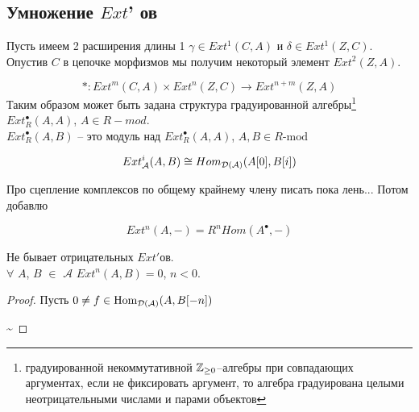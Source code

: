 \documentclass[../main.tex]{subfiles}
\begin{document}
\subsection{Умножение $Ext$' ов}
Пусть имеем 2 расширения длины 1 $\gamma \in Ext^1(C, A)$ и $\delta \in Ext^1(Z, C)$. Опустив $C$ в цепочке морфизмов мы получим некоторый элемент $Ext^2(Z, A)$.
\bee
{}
\eee
\[
* \colon Ext^m (C, A) \times Ext^n(Z, C) \rightarrow Ext^{n+m}(Z, A)
\]
Таким образом может быть задана структура градуированной алгебры\footnote{градуированной некоммутативной $\mathbb{Z}_{\ge 0}$--алгебры при совпадающих аргументах, если не фиксировать аргумент, то алгебра градуирована целыми неотрицательными числами и парами объектов
} $Ext_{R}^\bullet (A, A)$, $A\in R-mod $.\\
$Ext_{R}^\bullet(A, B)$ -- это модуль над $Ext_{R}^\bullet(A, A)$, $A, B \in R\text{-mod} $
\begin{to_claim}
\[Ext_{\mathcal{A}}^i(A, B) \cong Hom_{\mathcal{D(A)}}(A[0], B[i])\]
\bee
\eee
\end{to_claim}
{\color{green} Про сцепление комплексов по общему крайнему члену писать пока лень... Потом добавлю}
\begin{to_claim}
\[
Ext^n(A, -) = R^n Hom(A^\bullet, -)
\]
\end{to_claim}
\begin{to_claim}
Не бывает отрицательных $Ext'$ов.\\
$\forall$ $A$, $B$ $\in$ $\mathcal{A}$ $Ext^n (A, B) = 0$, $n<0$.
\begin{proof}
Пусть $0 \neq f \in \operatorname{Hom}_{\mathcal{D(A)}}(A, B[-n])$
\bee
{}
\sim\text{ }
\eee
\end{proof}
\end{to_claim}
\end{document}
